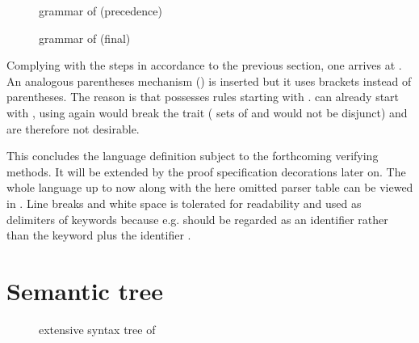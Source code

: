 \begin{figure}[H]
	\centering
	
	

	\caption{grammar of  (precedence)}
	\label{fig:grammar_core_bool_exp_prec}
\end{figure}

\begin{figure}[H]
	\centering
	
	

	\caption{grammar of  (final)}
	\label{fig:grammar_core_bool_exp_final}
\end{figure}

Complying with the steps in accordance to the previous section, one arrives at . An analogous parentheses mechanism () is inserted but it uses brackets instead of parentheses. The reason is that  possesses rules starting with .  can already start with \textterminal{(}, using \textterminal{(} again would break the \textlang{} trait ( sets of  and  would not be disjunct) and are therefore not desirable.

This concludes the language definition subject to the forthcoming verifying methods. It will be extended by the proof specification decorations later on. The whole language up to now along with the here omitted parser table can be viewed in . Line breaks and white space is tolerated for readability and used as delimiters of keywords because e.g.  should be regarded as an identifier  rather than the keyword  plus the identifier .

\FloatBarrier
\section{Semantic tree}

\begin{figure}[H]
	\begin{center}
		
	\end{center}

	\caption{extensive syntax tree of }
	\label{fig:tree_semanticTree_syntax_A1}
\end{figure}

